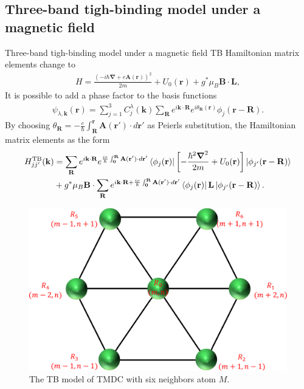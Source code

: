 \documentclass[aspectratio=169,compress,x11names]{beamer}
\begin{document}
	\subsection{Three-band tigh-binding model under a magnetic field}
	\begin{frame}{Three-band tigh-binding model under a magnetic field}
		TB Hamiltonian matrix elements change to
		\begin{gather}
			H= \frac{(-i \hbar \boldsymbol{\nabla} + e \mathbf{A}(\mathbf{r}))^{2}}{2m} + U_{0}(\mathbf{r}) + g^{*} \mu_{B} \mathbf{B} \cdot \mathbf{L},
		\end{gather}
		It is possible to add a phase factor to the basis functions
		\begin{gather}
			\psi_{\lambda,\mathbf{k}}(\mathbf{r}) = \sum_{j=1}^{3} C_{j}^{\lambda}(\mathbf{k}) \sum_{\mathbf{R}} e^{i \mathbf{k} \cdot \mathbf{R} } e^{i\theta_\mathbf{R}(\mathbf{r})} \phi_{j}(\mathbf{r} - \mathbf{R}).
		\end{gather}
		By choosing $\theta_\mathbf{R} = - \tfrac{e}{\hbar} \int_{\mathbf{R}}^{\mathbf{r}} \mathbf{A}(\mathbf{r'}) \cdot d\mathbf{r}' $ as Peierls substitution, the Hamiltonian matrix elements as the form
		\begin{equation}
			\begin{aligned}
				H_{jj'}^{\text{TB}}(\mathbf{k})
				&= \sum_{\mathbf{R}} e^{i\mathbf{k \cdot R}} e^{\frac{ie}{\hbar} \int_{\mathbf{0}}^{\mathbf{R}} \mathbf{A(\mathbf{r'})} \cdot d \mathbf{r'} } \bra{\phi_{j}(\mathbf{r})} \left[ -\frac{\hbar^{2} \boldsymbol{\nabla}^{2}}{2m} + U_{0} (\mathbf{r}) \right] \ket{\phi_{j'}(\mathbf{r - R})} \\
				&+ g^{*} \mu_{B} \mathbf{B} \cdot \sum_{\mathbf{R}} e^{i\mathbf{k \cdot R} + \frac{ie}{\hbar} \int_{\mathbf{0}}^{\mathbf{R}} \mathbf{A(\mathbf{r'})} \cdot d\mathbf{r'} } \bra{\phi_{j}(\mathbf{r})} \mathbf{L} \ket{\phi_{j'}(\mathbf{r - R})}.
			\end{aligned}
		\end{equation}
	\end{frame}
	\begin{frame}
		\begin{figure}
			\centering
			\includegraphics[width=0.5\linewidth]{./pic/siteindex_crop.pdf}
			\caption{\label{fig:site index} The TB model of TMDC with six neighbors atom $M$.}
		\end{figure}
	\end{frame}
\end{document}
